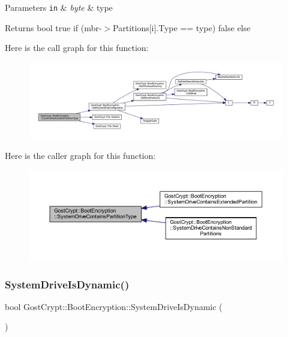 \begin{DoxyParams}[1]{Parameters}
\mbox{\tt in}  & {\em byte} & type \\
\hline
\end{DoxyParams}
\begin{DoxyReturn}{Returns}
bool true if (mbr-\/$>$Partitions\mbox{[}i\mbox{]}.Type == type) false else 
\end{DoxyReturn}
Here is the call graph for this function\+:
\nopagebreak
\begin{figure}[H]
\begin{center}
\leavevmode
\includegraphics[width=350pt]{class_gost_crypt_1_1_boot_encryption_a3638d4139eef90bc7f913fea8290e49e_cgraph}
\end{center}
\end{figure}
Here is the caller graph for this function\+:
\nopagebreak
\begin{figure}[H]
\begin{center}
\leavevmode
\includegraphics[width=350pt]{class_gost_crypt_1_1_boot_encryption_a3638d4139eef90bc7f913fea8290e49e_icgraph}
\end{center}
\end{figure}
\mbox{\label{class_gost_crypt_1_1_boot_encryption_a639795ac588f2523a75cc573cc537262}} 
\subsubsection{\texorpdfstring{System\+Drive\+Is\+Dynamic()}{SystemDriveIsDynamic()}}
{\footnotesize\ttfamily bool Gost\+Crypt\+::\+Boot\+Encryption\+::\+System\+Drive\+Is\+Dynamic (\begin{DoxyParamCaption}{ }\end{DoxyParamCaption})}



